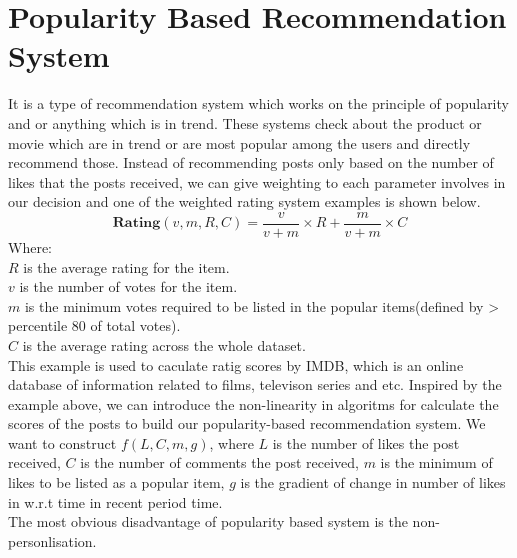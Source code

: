 \section{Popularity Based Recommendation System}
It is a type of recommendation system which works on the principle of popularity and or anything which is in trend. These systems check about the product or movie which are in trend or are most popular among the users and directly recommend those. 
Instead of recommending posts only based on the number of likes that the posts received, we can give weighting to each parameter involves in our decision and one of the weighted rating system examples is shown below.
\begin{equation}
\textbf{Rating}(v,m,R,C) = \frac{v}{v+m} \times R + \frac{m}{v+m} \times C
\end{equation}
Where:
\\$R$ is the average rating for the item.
\\$v$ is the number of votes for the item.
\\$m$ is the minimum votes required to be listed in the popular items(defined by > percentile 80 of total votes).
\\$C$ is the average rating across the whole dataset.
\\This example is used to caculate ratig scores by IMDB, which is an online database of information related to films, televison series and etc. 
Inspired by the example above, we can introduce the non-linearity in algoritms for calculate the scores of the posts to build our popularity-based recommendation system.
We want to construct $f(L,C,m,g)$, where $L$ is the number of likes the post received, $C$ is the number of comments the post received, 
$m$ is the minimum of likes to be listed as a popular item, $g$ is the gradient of change in number of likes in w.r.t time in recent period time.
\\The most obvious disadvantage of popularity based system is the non-personlisation.




